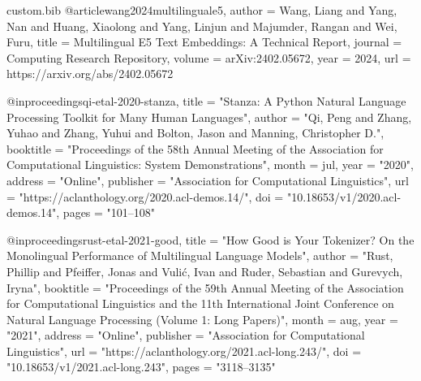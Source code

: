 \begin{filecontents*}[overwrite]{custom.bib}
@article{wang2024multilinguale5,
    author  = {Wang, Liang and Yang, Nan and Huang, Xiaolong and Yang, Linjun and Majumder, Rangan and Wei, Furu},
    title   = {Multilingual {E}5 Text Embeddings: A Technical Report},
    journal = {Computing Research Repository},
    volume  = {arXiv:2402.05672},
    year    = {2024},
    url     = {https://arxiv.org/abs/2402.05672}
}

@inproceedings{qi-etal-2020-stanza,
    title     = "{S}tanza: A {P}ython Natural Language Processing Toolkit for Many Human Languages",
    author    = "Qi, Peng  and
      Zhang, Yuhao  and
      Zhang, Yuhui  and
      Bolton, Jason  and
      Manning, Christopher D.",
    booktitle = "Proceedings of the 58th Annual Meeting of the Association for Computational Linguistics: System Demonstrations",
    month     = jul,
    year      = "2020",
    address   = "Online",
    publisher = "Association for Computational Linguistics",
    url       = "https://aclanthology.org/2020.acl-demos.14/",
    doi       = "10.18653/v1/2020.acl-demos.14",
    pages     = "101--108"
}

@inproceedings{rust-etal-2021-good,
    title     = "How Good is Your Tokenizer? On the Monolingual Performance of Multilingual Language Models",
    author    = "Rust, Phillip  and
      Pfeiffer, Jonas  and
      Vuli{\'c}, Ivan  and
      Ruder, Sebastian  and
      Gurevych, Iryna",
    booktitle = "Proceedings of the 59th Annual Meeting of the Association for Computational Linguistics and the 11th International Joint Conference on Natural Language Processing (Volume 1: Long Papers)",
    month     = aug,
    year      = "2021",
    address   = "Online",
    publisher = "Association for Computational Linguistics",
    url       = "https://aclanthology.org/2021.acl-long.243/",
    doi       = "10.18653/v1/2021.acl-long.243",
    pages     = "3118--3135"
}
\end{filecontents*}

\documentclass[11pt]{article}

\usepackage[review]{acl}

\usepackage{times}
\usepackage{latexsym}

\usepackage[T1]{fontenc}


